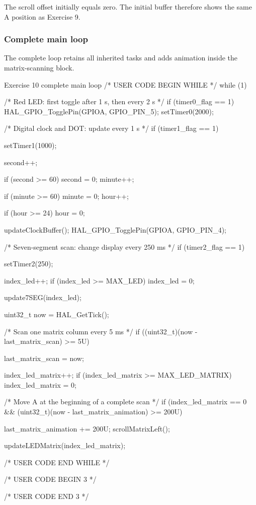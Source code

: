 \documentclass[a4paper]{article}
\begin{document}
The scroll offset initially equals zero.
The initial buffer therefore shows the same
A position as Exercise 9.

\subsubsection{Complete main loop}

The complete loop retains all inherited
tasks and adds animation inside the
matrix-scanning block.

\begin{stmcode}{Exercise 10 complete main loop}
/* USER CODE BEGIN WHILE */
while (1) {
    /* Red LED: first toggle after 1 s, then every 2 s */
    if (timer0_flag == 1) {
      HAL_GPIO_TogglePin(GPIOA, GPIO_PIN_5);
      setTimer0(2000);
    }

    /* Digital clock and DOT: update every 1 s */
    if (timer1_flag == 1) {
      setTimer1(1000);

      second++;

      if (second >= 60) {
        second = 0;
        minute++;
      }

      if (minute >= 60) {
        minute = 0;
        hour++;
      }

      if (hour >= 24) {
        hour = 0;
      }

      updateClockBuffer();
      HAL_GPIO_TogglePin(GPIOA, GPIO_PIN_4);
    }

    /* Seven-segment scan: change display every 250 ms */
    if (timer2_flag == 1) {
      setTimer2(250);

      index_led++;
      if (index_led >= MAX_LED) {
        index_led = 0;
      }

      update7SEG(index_led);
    }

    uint32_t now = HAL_GetTick();

    /* Scan one matrix column every 5 ms */
    if ((uint32_t)(now - last_matrix_scan) >= 5U) {
      last_matrix_scan = now;

      index_led_matrix++;
      if (index_led_matrix >= MAX_LED_MATRIX) {
        index_led_matrix = 0;
      }

      /* Move A at the beginning of a complete scan */
      if (index_led_matrix == 0 &&
          (uint32_t)(now - last_matrix_animation) >= 200U) {

        last_matrix_animation += 200U;
        scrollMatrixLeft();
      }

      updateLEDMatrix(index_led_matrix);
    }
    /* USER CODE END WHILE */

    /* USER CODE BEGIN 3 */
}
/* USER CODE END 3 */
\end{stmcode}
\end{document}
